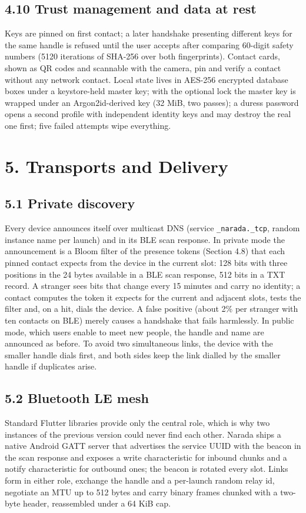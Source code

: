 \documentclass[conference]{IEEEtran}
\begin{document}
\subsection{4.10 Trust management and data at rest}
Keys are pinned on first contact; a later handshake presenting different keys for the same handle is refused until the user accepts after comparing 60-digit safety numbers (5120 iterations of SHA-256 over both fingerprints). Contact cards, shown as QR codes and scannable with the camera, pin and verify a contact without any network contact. Local state lives in AES-256 encrypted database boxes under a keystore-held master key; with the optional lock the master key is wrapped under an Argon2id-derived key (32 MiB, two passes); a duress password opens a second profile with independent identity keys and may destroy the real one first; five failed attempts wipe everything.

\section{5. Transports and Delivery}
\subsection{5.1 Private discovery}
Every device announces itself over multicast DNS (service \texttt{\_narada.\_tcp}, random instance name per launch) and in its BLE scan response. In private mode the announcement is a Bloom filter \cite{ref27} of the presence tokens (Section 4.8) that each pinned contact expects from the device in the current slot: 128 bits with three positions in the 24 bytes available in a BLE scan response, 512 bits in a TXT record. A stranger sees bits that change every 15 minutes and carry no identity; a contact computes the token it expects for the current and adjacent slots, tests the filter and, on a hit, dials the device. A false positive (about 2\% per stranger with ten contacts on BLE) merely causes a handshake that fails harmlessly. In public mode, which users enable to meet new people, the handle and name are announced as before. To avoid two simultaneous links, the device with the smaller handle dials first, and both sides keep the link dialled by the smaller handle if duplicates arise.

\subsection{5.2 Bluetooth LE mesh}
Standard Flutter libraries provide only the central role, which is why two instances of the previous version could never find each other. Narada ships a native Android GATT server that advertises the service UUID with the beacon in the scan response and exposes a write characteristic for inbound chunks and a notify characteristic for outbound ones; the beacon is rotated every slot. Links form in either role, exchange the handle and a per-launch random relay id, negotiate an MTU up to 512 bytes and carry binary frames chunked with a two-byte header, reassembled under a 64 KiB cap.
\end{document}
